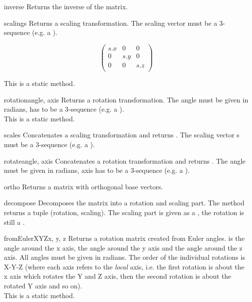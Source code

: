 \begin{methoddesc}{inverse}{}
Returns the inverse of the matrix.
\end{methoddesc}

\begin{methoddesc}{scaling}{s}
Returns a scaling transformation. The scaling vector  must be a
3-sequence (e.g. a ).

\[ \left( \begin{array}{ccc}
s.x & 0 & 0 \\
0 & s.y & 0 \\
0 & 0 & s.z \\
\end{array} \right) \]

This is a static method.
\end{methoddesc}

\begin{methoddesc}{rotation}{angle, axis}
Returns a rotation transformation. The angle must be given in radians,
 has to be a 3-sequence (e.g. a ).\\
This is a static method.
\end{methoddesc}

\begin{methoddesc}{scale}{s}
Concatenates a scaling transformation and returns . The scaling
vector s must be a 3-sequence (e.g. a ).
\end{methoddesc}

\begin{methoddesc}{rotate}{angle, axis}
Concatenates a rotation transformation and returns . The angle
must be given in radians, axis has to be a 3-sequence (e.g. a ).
\end{methoddesc}

\begin{methoddesc}{ortho}{}
Returns a matrix with orthogonal base vectors.
\end{methoddesc}

\begin{methoddesc}{decompose}{}
Decomposes the matrix into a rotation and scaling part. The method
returns a tuple (rotation, scaling). The scaling part is given as a
, the rotation is still a .
\end{methoddesc}

\begin{methoddesc}{fromEulerXYZ}{x, y, z}
Returns a rotation matrix created from Euler angles.  is the angle
around the x axis,  the angle around the y axis and  the
angle around the z axis. All angles must be given in radians. The order
of the individual rotations is X-Y-Z (where each axis refers to the {\em
local} axis, i.e. the first rotation is about the x axis which rotates
the Y and Z axis, then the second rotation is about the rotated Y axis 
and so on).\\
This is a static method.
\end{methoddesc}

